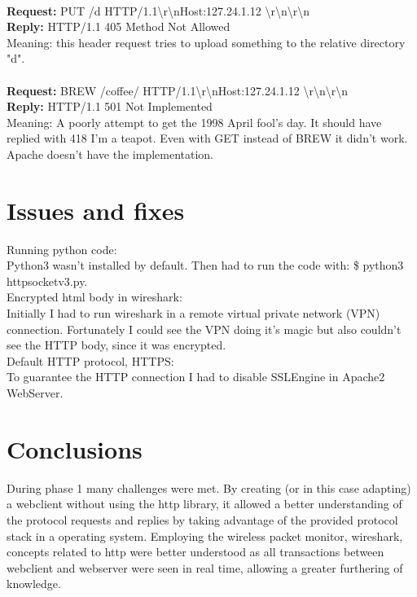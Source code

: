 \documentclass[11pt,a4paper]{report}
\begin{document}
        \\
        \textbf{Request:} PUT /d HTTP/1.1\textbackslash r\textbackslash nHost:127.24.1.12 \textbackslash r\textbackslash n\textbackslash r\textbackslash n \\
        \textbf{Reply:} HTTP/1.1 405 Method Not Allowed \\
        Meaning: this header request tries to upload something to the relative directory "d". \\
        \\
        \textbf{Request:} BREW /coffee/ HTTP/1.1\textbackslash r\textbackslash nHost:127.24.1.12 \textbackslash r\textbackslash n\textbackslash r\textbackslash n \\
        \textbf{Reply:} HTTP/1.1 501 Not Implemented \\
        Meaning: A poorly attempt to get the 1998 April fool's day. It should have replied with 418 I'm a teapot. Even with GET instead of BREW it didn't work. Apache doesn't have the implementation. \\

\chapter{Issues and fixes}
    Running python code: \\
        \hspace*{10mm}Python3 wasn't installed by default. Then had to run the code with: \$ python3 httpsocketv3.py. \\
    Encrypted html body in wireshark: \\
        \hspace*{10mm}Initially I had to run wireshark in a remote virtual private network (VPN) connection. Fortunately I could see the VPN doing it's magic but also couldn't see the HTTP body, since it was encrypted. \\
    Default HTTP protocol, HTTPS: \\
        \hspace*{10mm}To guarantee the HTTP connection I had to disable SSLEngine in Apache2 WebServer. \\

\chapter{Conclusions}
During phase 1 many challenges were met.
By creating (or in this case adapting) a webclient without using the http library, it allowed a better understanding of the protocol requests and replies by taking advantage of the provided protocol stack in a operating system.
Employing the wireless packet monitor, wireshark, concepts related to http were better understood as all transactions between webclient and webserver were seen in real time, allowing a greater furthering of knowledge.
\end{document}
